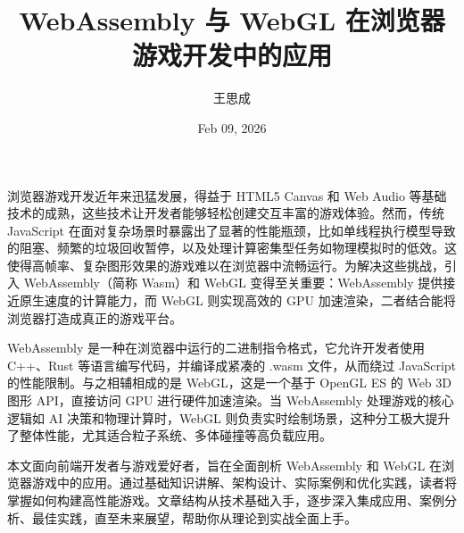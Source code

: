 \title{WebAssembly 与 WebGL 在浏览器游戏开发中的应用}
\author{王思成}
\date{Feb 09, 2026}
\maketitle
浏览器游戏开发近年来迅猛发展，得益于 HTML5 Canvas 和 Web Audio 等基础技术的成熟，这些技术让开发者能够轻松创建交互丰富的游戏体验。然而，传统 JavaScript 在面对复杂场景时暴露出了显著的性能瓶颈，比如单线程执行模型导致的阻塞、频繁的垃圾回收暂停，以及处理计算密集型任务如物理模拟时的低效。这使得高帧率、复杂图形效果的游戏难以在浏览器中流畅运行。为解决这些挑战，引入 WebAssembly（简称 Wasm）和 WebGL 变得至关重要：WebAssembly 提供接近原生速度的计算能力，而 WebGL 则实现高效的 GPU 加速渲染，二者结合能将浏览器打造成真正的游戏平台。\par
WebAssembly 是一种在浏览器中运行的二进制指令格式，它允许开发者使用 C++、Rust 等语言编写代码，并编译成紧凑的 .wasm 文件，从而绕过 JavaScript 的性能限制。与之相辅相成的是 WebGL，这是一个基于 OpenGL ES 的 Web 3D 图形 API，直接访问 GPU 进行硬件加速渲染。当 WebAssembly 处理游戏的核心逻辑如 AI 决策和物理计算时，WebGL 则负责实时绘制场景，这种分工极大提升了整体性能，尤其适合粒子系统、多体碰撞等高负载应用。\par
本文面向前端开发者与游戏爱好者，旨在全面剖析 WebAssembly 和 WebGL 在浏览器游戏中的应用。通过基础知识讲解、架构设计、实际案例和优化实践，读者将掌握如何构建高性能游戏。文章结构从技术基础入手，逐步深入集成应用、案例分析、最佳实践，直至未来展望，帮助你从理论到实战全面上手。\par
